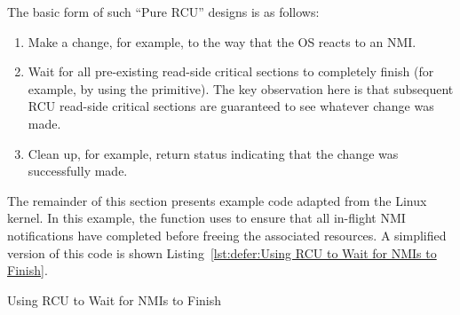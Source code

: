 The basic form of such ``Pure RCU'' designs is as follows:

\begin{enumerate}
\item	Make a change, for example, to the way that the OS reacts to an NMI\@.
\item	Wait for all pre-existing read-side critical sections to
	completely finish (for example, by using the
	 primitive).
	The key observation here is that subsequent RCU read-side critical
	sections are guaranteed to see whatever change was made.
\item	Clean up, for example, return status indicating that the
	change was successfully made.
\end{enumerate}

The remainder of this section presents example code adapted from
the Linux kernel.
In this example, the  function uses
 to ensure that all in-flight NMI
notifications have completed before freeing the associated resources.
A simplified version of this code is shown
Listing~\ref{lst:defer:Using RCU to Wait for NMIs to Finish}.

\begin{listing}[tbp]
\begin{fcvlabel}
\end{fcvlabel}
\caption{Using RCU to Wait for NMIs to Finish}
\label{lst:defer:Using RCU to Wait for NMIs to Finish}
\end{listing}

